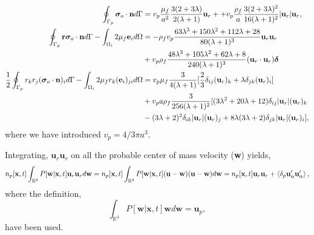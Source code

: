 \begin{align}
    \label{eq:forces_reformulated1}
    \intS[p]{\bm\sigma_{o}\cdot \textbf{n}}
    &=
    v_p \frac{\mu_f}{a^2}  \frac{3(2+3\lambda)}{2(\lambda+1)}\textbf{u}_r+ 
    + v_p \frac{\rho_f}{a} \frac{3 (2+3\lambda)^2}{16 (\lambda+1)^2}
    |\textbf{u}_r| \textbf{u}_r,\\
        \intS[p]{\textbf{r}\bm\sigma_{o}\cdot \textbf{n}}
        - \intO[i]{2\mu_f \textbf{e}_i}
        &= 
        - \rho_f v_p  \frac{63 \lambda^{3} + 150 \lambda^{2} + 112 \lambda + 28}{80 (\lambda+1)^{3}}  \textbf{u}_r \textbf{u}_r
       \\ \nonumber
        &+ v_p \rho_f   \frac{48\lambda^3 + 105 \lambda^2 + 62\lambda + 8}{240 (\lambda+1)^3} (\textbf{u}_r\cdot \textbf{u}_r) \bm\delta\\
    \label{eq:forces_reformulated2}
        \frac{1}{2}\intS[p]{r_kr_j ( \bm\sigma_{o}\cdot \textbf{n})_i}
        - \intO[i]  { 2\mu_f r_k (\textbf{e}_i)_{ji}}
        &= v_p \mu_f \frac{ 3}{4(\lambda+1)} [
            \frac{2}{3}\delta_{ij} (\textbf{u}_r)_k 
            + \lambda \delta_{jk} (\textbf{u}_r)_i
        ]\\ 
        &+ v_p a \rho_f  
        \frac{3}{256(\lambda+1)^2} [
            (3\lambda^2+20\lambda +12) \delta_{ij} |\textbf{u}_r|(\textbf{u}_r)_k \\
            &-( 3\lambda+2)^2 \delta_{ik} |\textbf{u}_r|(\textbf{u}_r)_j 
            + 8 \lambda (3\lambda+2)\delta_{jk} |\textbf{u}_r|(\textbf{u}_r)_i
        ], 
        \label{eq:forces_reformulated3}
\end{align}
where we have introduced $v_p = 4/3\pi a^3$. 

Integrating, $\textbf{u}_r\textbf{u}_r$ on all the probable center of mass velocity (\textbf{w}) yields, 
\begin{equation}
    n_p[\textbf{x},t]\int_{\mathbb{R}^3} P[\textbf{w}|\textbf{x},t]
    \textbf{u}_r\textbf{u}_r d\textbf{w}
    =
    n_p[\textbf{x},t]\int_{\mathbb{R}^3} P[\textbf{w}|\textbf{x},t]
    (\textbf{u}-\textbf{w})(\textbf{u}-\textbf{w}) 
    d\textbf{w}
    = 
    n_p[\textbf{x},t] \textbf{u}_r \textbf{u}_r
    + \pavg{\textbf{u}_\alpha'\textbf{u}_\alpha'},
    \label{eq:standard_dev1}
\end{equation}
where the definition, 
\begin{equation}
    \int_{\mathbb{R}^3} P[\textbf{w}|\textbf{x},t]
    \textbf{w} d\textbf{w} = \textbf{u}_p,
\end{equation}
have been used. 

